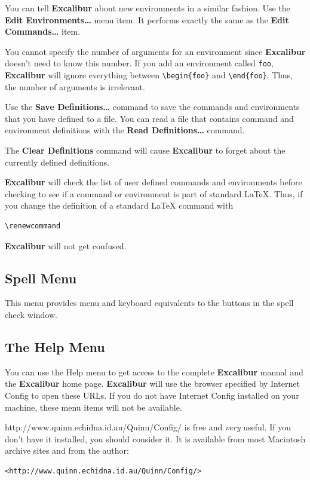 ﻿\documentclass[11pt,titlepage]{article}
\newcommand{\ex}{\textbf{Excalibur}}
\begin{document}
You can tell \ex{} about new environments in a similar fashion.  Use
the \textbf{Edit Environments\ldots} menu item.  It performs exactly
the same as the \textbf{Edit Commands\ldots} item.

You cannot specify the number of arguments for an environment since
\ex{} doesn't need to know this number.  If you add an environment
called \texttt{foo}, \ex{} will ignore everything between
\verb+\begin{foo}+ and \verb+\end{foo}+.  Thus, the number of
arguments is irrelevant.

Use the \textbf{Save Definitions\ldots} command to save the commands
and environments that you have defined to a file.  You can read a file
that contains command and environment definitions with the
\textbf{Read Definitions\ldots} command.

The \textbf{Clear Definitions} command will cause \ex{} to forget
about the currently defined definitions.

\ex{} will check the list of user defined commands and environments before
checking to see if a command or environment is part of standard
\LaTeX.  Thus, if you change the definition of a standard \LaTeX
command with
\begin{verbatim}
\renewcommand
\end{verbatim}
\ex{} will not get confused.

\subsection{Spell Menu}

This menu provides menu and keyboard equivalents to the buttons in the
spell check window.

\subsection{The Help Menu}

You can use the Help menu to get access to the complete \ex{} manual
and the \ex{} home page.  \ex{} will use the browser specified by
Internet Config to open these URLs.  If you do not have Internet
Config installed on your machine, these menu items will not be
available.

{http://www.quinn.echidna.id.au/Quinn/Config/} is free and \emph{very}
useful.  If you don't have it installed, you should consider it.  It
is available from most Macintosh archive sites and from the author:
\begin{verbatim}
<http://www.quinn.echidna.id.au/Quinn/Config/>
\end{verbatim}
\end{document}
